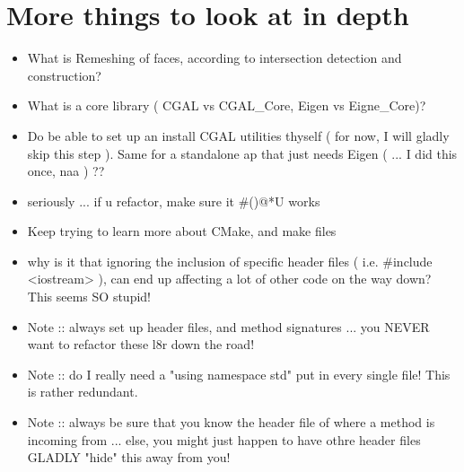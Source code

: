 \documentclass{article}
\begin{document}
\section{More things to look at in depth}
\begin{itemize}
	\item What is Remeshing of faces, according to intersection detection and construction?
	\item What is a core library ( CGAL vs CGAL_Core, Eigen vs Eigne_Core)?
	\item Do be able to set up an install CGAL utilities thyself ( for now, I will gladly skip this step ). Same for a standalone ap that just needs Eigen ( ... I did this once, naa ) ?? 
	\item seriously ... if u refactor, make sure it #()@*U works
	\item Keep trying to learn more about CMake, and make files
	\item why is it that ignoring the inclusion of specific header files ( i.e. #include <iostream> ), can end up affecting a lot of other code on the way down? This seems SO stupid!
	\item Note :: always set up header files, and method signatures ... you NEVER want to refactor these l8r down the road!
	\item Note :: do I really need a "using namespace std" put in every single file! This is rather redundant.
	\item Note :: always be sure that you know the header file of where a method is incoming from ... else, you might just happen to have othre header files GLADLY "hide" this away from you! 
\end{itemize}
\end{document}
